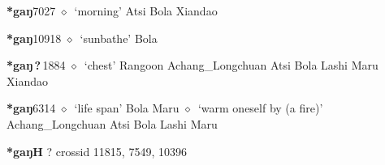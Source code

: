   \begin{list}{}{\leftmargin=1.5em \itemindent=-1.5em}
  \item {\footnotesize \textbf{*gaŋ}}{\tiny 7027}
         $\diamond$~`morning'
         Atsi 
\hspace{1ex}
         Bola 
\hspace{1ex}
         Xiandao 
  \item {\footnotesize \textbf{*gaŋ}}{\tiny 10918}
\hspace{1ex}
         $\diamond$~`sunbathe'
         Bola 
  \item {\footnotesize \textbf{*gaŋ\,?\,}}{\tiny 1884}
\hspace{1ex}
         $\diamond$~`chest'
         Rangoon 
\hspace{1ex}
         Achang\_Longchuan 
\hspace{1ex}
         Atsi 
\hspace{1ex}
         Bola 
\hspace{1ex}
         Lashi 
\hspace{1ex}
         Maru 
\hspace{1ex}
         Xiandao 
  \item {\footnotesize \textbf{*gaŋ}}{\tiny 6314}
\hspace{1ex}
         $\diamond$~`life span'
         Bola 
\hspace{1ex}
         Maru 
\hspace{1ex}
         $\diamond$~`warm oneself by (a fire)'
         Achang\_Longchuan 
\hspace{1ex}
         Atsi 
\hspace{1ex}
         Bola 
\hspace{1ex}
         Lashi 
\hspace{1ex}
         Maru 
  \end{list}
\item
\textbf{*gaŋH}
?
  {\tiny crossid 11815, 7549, 10396}
